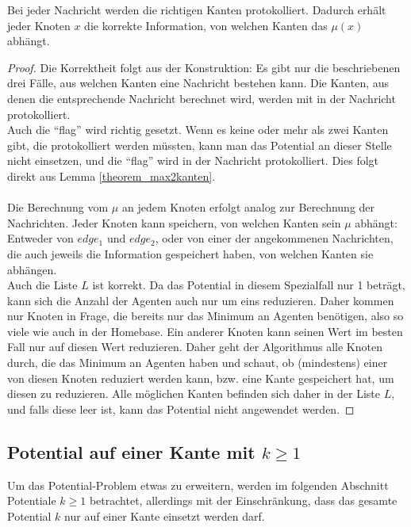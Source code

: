 	\begin{theorem}
		Bei jeder Nachricht werden die richtigen Kanten protokolliert. Dadurch erhält jeder Knoten $x$ die korrekte Information, von welchen Kanten das $\mu(x)$ abhängt. 
	\end{theorem}
	\begin{proof}
		Die Korrektheit folgt aus der Konstruktion: Es gibt nur die beschriebenen drei Fälle, aus welchen Kanten eine Nachricht bestehen kann. Die Kanten, aus denen die entsprechende Nachricht berechnet wird, werden mit in der Nachricht protokolliert.\\
		Auch die "`flag"' wird richtig gesetzt. Wenn es keine oder mehr als zwei Kanten gibt, die protokolliert werden müssten, kann man das Potential an dieser Stelle nicht einsetzen, und die "`flag"' wird in der Nachricht protokolliert. Dies folgt direkt aus Lemma \ref{theorem_max2kanten}.
		\\
		\\
		Die Berechnung vom $\mu$ an jedem Knoten erfolgt analog zur Berechnung der Nachrichten. Jeder Knoten kann speichern, von welchen Kanten sein $\mu$ abhängt: Entweder von $edge_{1}$ und $edge_{2}$, oder von einer der angekommenen Nachrichten, die auch jeweils die Information gespeichert haben, von welchen Kanten sie abhängen.\\
		Auch die Liste $L$ ist korrekt. Da das Potential in diesem Spezialfall nur 1 beträgt, kann sich die Anzahl der Agenten auch nur um eins reduzieren. Daher kommen nur Knoten in Frage, die bereits nur das Minimum an Agenten benötigen, also so viele wie auch in der Homebase. Ein anderer Knoten kann seinen Wert im besten Fall nur auf diesen Wert reduzieren. Daher geht der Algorithmus alle Knoten durch, die das Minimum an Agenten haben und schaut, ob (mindestens) einer von diesen Knoten reduziert werden kann, bzw. eine Kante gespeichert hat, um diesen zu reduzieren. Alle möglichen Kanten befinden sich daher in der Liste $L$, und falls diese leer ist, kann das Potential nicht angewendet werden.
		
	\end{proof}


\subsection{Potential auf einer Kante mit $k \geq 1$}\label{kap_pot>=1}


Um das Potential-Problem etwas zu erweitern, werden im folgenden Abschnitt Potentiale $k \geq 1$ betrachtet, allerdings mit der Einschränkung, dass das gesamte Potential $k$ nur auf einer Kante einsetzt werden darf.

